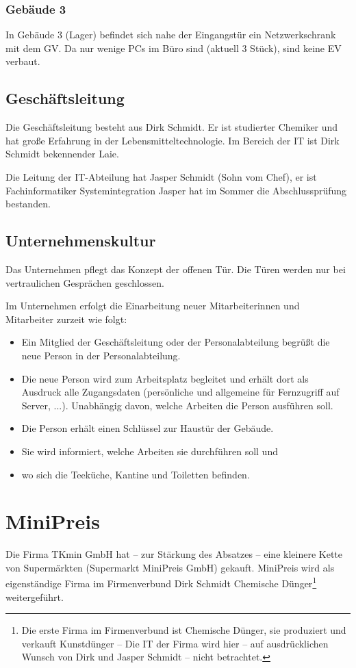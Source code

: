 \documentclass[a4paper,10pt]{scrreprt}
\begin{document}
\subsection{Gebäude 3}
In Gebäude 3 (Lager) befindet sich nahe der Eingangstür ein Netzwerkschrank mit dem GV. Da nur wenige PCs im Büro sind (aktuell 3 Stück), sind keine EV verbaut.

\section{Geschäftsleitung}
Die Geschäftsleitung besteht aus Dirk Schmidt. Er ist studierter Chemiker und hat große Erfahrung in der Lebensmitteltechnologie. Im Bereich der IT ist Dirk Schmidt bekennender Laie.

Die Leitung der IT-Abteilung hat Jasper Schmidt (Sohn vom Chef), er ist Fachinformatiker Systemintegration Jasper hat im Sommer die Abschlussprüfung bestanden.

\section{Unternehmenskultur}
Das Unternehmen pflegt das Konzept der offenen Tür. Die Türen werden nur bei vertraulichen Gesprächen geschlossen.

Im Unternehmen erfolgt die Einarbeitung neuer Mitarbeiterinnen und Mitarbeiter zurzeit wie folgt:
\begin{itemize}
 \item Ein Mitglied der Geschäftsleitung oder der Personalabteilung begrüßt die neue Person in der Personalabteilung.
 \item Die neue Person wird zum Arbeitsplatz begleitet und erhält dort als Ausdruck alle Zugangsdaten (persönliche und allgemeine für Fernzugriff auf Server, ...). Unabhängig davon, welche Arbeiten die Person ausführen soll.
 \item Die Person erhält einen Schlüssel zur Haustür der Gebäude.
 \item Sie wird informiert, welche Arbeiten sie durchführen soll und
 \item wo sich die Teeküche, Kantine und Toiletten befinden.
\end{itemize}

\chapter{MiniPreis}
Die Firma TKmin GmbH hat – zur Stärkung des Absatzes – eine kleinere Kette von Supermärkten (Supermarkt MiniPreis GmbH) gekauft. MiniPreis  wird als eigenständige Firma im Firmenverbund Dirk Schmidt Chemische Dünger\footnote{Die erste Firma im Firmenverbund ist Chemische Dünger, sie produziert und verkauft Kunstdünger -- Die IT der Firma wird hier -- auf ausdrücklichen Wunsch von Dirk und Jasper Schmidt -- nicht betrachtet.} weitergeführt.
\end{document}
